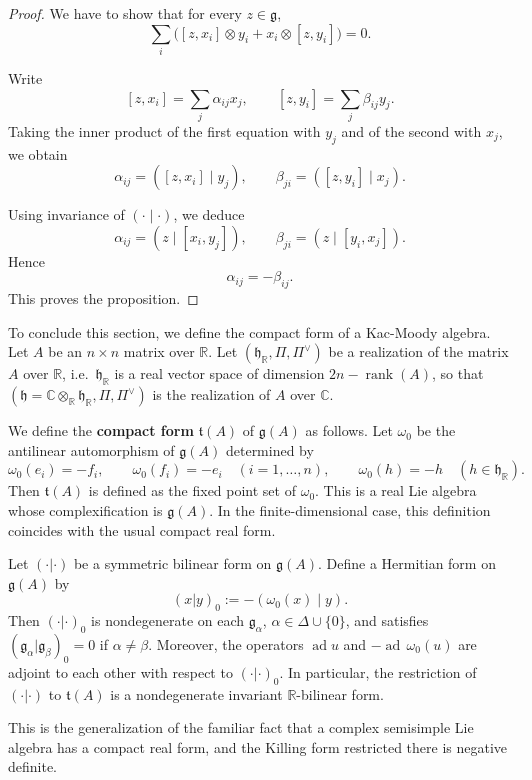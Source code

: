 \documentclass[12pt]{article}
\begin{document}
\begin{proof}
    We have to show that for every $z \in \mathfrak g$,
    \[
        \sum_i \big([z,x_i]\otimes y_i + x_i \otimes [z,y_i]\big) = 0.
    \]

    Write
    \[
        [z,x_i] = \sum_j \alpha_{ij} x_j,\qquad [z,y_i] = \sum_j \beta_{ij} y_j.
    \]
    Taking the inner product of the first equation with $y_j$ and of the second with $x_j$, we obtain
    \[
        \alpha_{ij} = ([z,x_i]\mid y_j),\qquad \beta_{ji} = ([z,y_i]\mid x_j).
    \]

    Using invariance of $(\cdot \mid \cdot)$, we deduce
    \[
        \alpha_{ij} = (z\mid [x_i,y_j]), \qquad \beta_{ji} = (z\mid [y_i,x_j]).
    \]
    Hence
    \[
        \alpha_{ij} = -\beta_{ij}.
    \]
    This proves the proposition.
\end{proof}

To conclude this section, we define the compact form of a Kac-Moody algebra. Let $A$ be an $n\times n$ matrix over $\mathbb{R}$. Let
$(\mathfrak h_\mathbb{R}, \Pi, \Pi^\vee)$ be a realization of the matrix $A$ over $\mathbb{R}$,
i.e.\ $\mathfrak h_\mathbb{R}$ is a real vector space of dimension $2n-\operatorname{rank}(A)$,
so that $(\mathfrak h = \mathbb{C}\otimes_\mathbb{R}\mathfrak h_\mathbb{R}, \Pi, \Pi^\vee)$ is the realization of $A$ over $\mathbb{C}$.

\begin{definition}
    We define the \textbf{compact form} $\mathfrak t(A)$ of $\mathfrak g(A)$ as follows.
    Let $\omega_0$ be the antilinear automorphism of $\mathfrak g(A)$ determined by
    \[
        \omega_0(e_i) = -f_i,\qquad
        \omega_0(f_i) = -e_i \quad (i=1,\dots,n),\qquad
        \omega_0(h) = -h \quad (h\in\mathfrak h_\mathbb{R}).
    \]
    Then $\mathfrak t(A)$ is defined as the fixed point set of $\omega_0$.
    This is a real Lie algebra whose complexification is $\mathfrak g(A)$.
    In the finite-dimensional case, this definition coincides with the usual compact real form.
\end{definition}

\begin{remark}
    Let $(\cdot|\cdot)$ be a symmetric bilinear form on $\mathfrak g(A)$.
    Define a Hermitian form on $\mathfrak g(A)$ by
    \[
        (x|y)_0 := -(\omega_0(x)\mid y).
    \]
    Then $(\cdot|\cdot)_0$ is nondegenerate on each $\mathfrak g_\alpha$, $\alpha\in\Delta\cup\{0\}$,
    and satisfies $(\mathfrak g_\alpha|\mathfrak g_\beta)_0 = 0$ if $\alpha\neq \beta$.
    Moreover, the operators $\operatorname{ad}u$ and $-\operatorname{ad}\,\omega_0(u)$ are adjoint to each other with respect to $(\cdot|\cdot)_0$.
    In particular, the restriction of $(\cdot|\cdot)$ to $\mathfrak t(A)$ is a nondegenerate invariant $\mathbb R$-bilinear form.

    This is the generalization of the familiar fact that a complex semisimple Lie algebra has a compact real form, and the Killing form restricted there is negative definite.
\end{remark}
\end{document}
